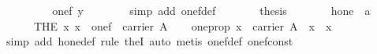 \begin{isabellebody}
\ \ \ \ \isamarkupfalse%
\ \isamarkupfalse%
\ {}{}{}{}\ {}\ one{}f\ y{}\isanewline
\ \ \ \ \ \ \isamarkupfalse%
\ {}simp\ add{}\ one{}f{}def{}\isanewline
\ \ \ \ \isamarkupfalse%
\ \isamarkupfalse%
\ {}thesis\ \isamarkupfalse%
\isanewline
\ \ \isamarkupfalse%
%
\endisatagproof
{\isafoldproof}%
%
\isadelimproof
\isanewline
%
\endisadelimproof
\isanewline
\ \ \isamarkupfalse%
\ hone\ {}{}\ {}{}a{}\ {}{}{}{}{}\ \isanewline
\ \ \ \ {}{}\ {}\ THE\ x{}\ x\ {}\ {}one{}f\ {}\ carrier\ A{}{}\isanewline
\isanewline
\ \ \isamarkupfalse%
\ one{}prop{}\ {}x\ {}\ carrier\ A\ {}\ x\ {}\ {}x\ {}\ {}{}\isanewline
%
\isadelimproof
\ \ \ \ %
\endisadelimproof
%
\isatagproof
{}\isamarkupfalse%
\ {}simp\ add{}\ hone{}def{}\ rule\ the{}I{}{}\ auto{}\ {}metis\ one{}f{}def\ one{}f{}const{}{}{}%

\end{isabellebody}
